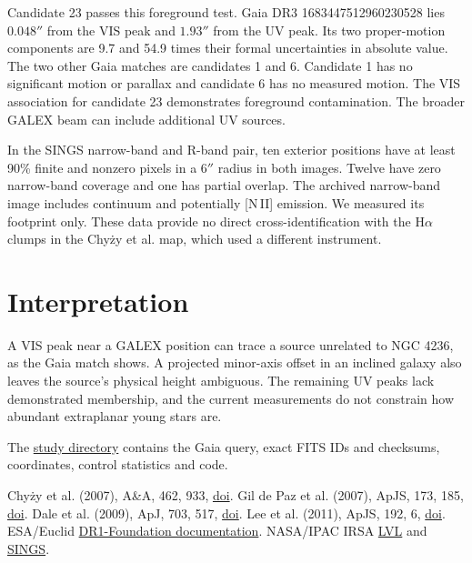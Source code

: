 \documentclass[10pt,a4paper]{article}
\begin{document}
Candidate 23 passes this foreground test. Gaia DR3 1683447512960230528 lies $0.048''$ from the VIS peak and $1.93''$ from the UV peak. Its two proper-motion components are 9.7 and 54.9 times their formal uncertainties in absolute value. The two other Gaia matches are candidates 1 and 6. Candidate 1 has no significant motion or parallax and candidate 6 has no measured motion. The VIS association for candidate 23 demonstrates foreground contamination. The broader GALEX beam can include additional UV sources.

In the SINGS narrow-band and R-band pair, ten exterior positions have at least 90\% finite and nonzero pixels in a $6''$ radius in both images. Twelve have zero narrow-band coverage and one has partial overlap. The archived narrow-band image includes continuum and potentially [N\,II] emission. We measured its footprint only. These data provide no direct cross-identification with the H$\alpha$ clumps in the Chy\.{z}y et al. map, which used a different instrument.

\section{Interpretation}
A VIS peak near a GALEX position can trace a source unrelated to NGC 4236, as the Gaia match shows. A projected minor-axis offset in an inclined galaxy also leaves the source's physical height ambiguous. The remaining UV peaks lack demonstrated membership, and the current measurements do not constrain how abundant extraplanar young stars are.

{\small The \href{https://github.com/Biswajit1999/daily-astro-notebooks/tree/research/ngc4236-uv-optical/euclid-dr1-foundation/ngc4236-uv-optical}{study directory} contains the Gaia query, exact FITS IDs and checksums, coordinates, control statistics and code.\par}

{\footnotesize Chy\.{z}y et al. (2007), A\&A, 462, 933, \href{https://doi.org/10.1051/0004-6361:20065932}{doi}. Gil de Paz et al. (2007), ApJS, 173, 185, \href{https://doi.org/10.1086/516636}{doi}. Dale et al. (2009), ApJ, 703, 517, \href{https://doi.org/10.1088/0004-637X/703/1/517}{doi}. Lee et al. (2011), ApJS, 192, 6, \href{https://doi.org/10.1088/0067-0049/192/1/6}{doi}. ESA/Euclid \href{https://euclid.esac.esa.int/dr/dr1/expsup/}{DR1-Foundation documentation}. NASA/IPAC IRSA \href{https://doi.org/10.26131/IRSA414}{LVL} and \href{https://doi.org/10.26131/IRSA424}{SINGS}.\par}
\end{document}
